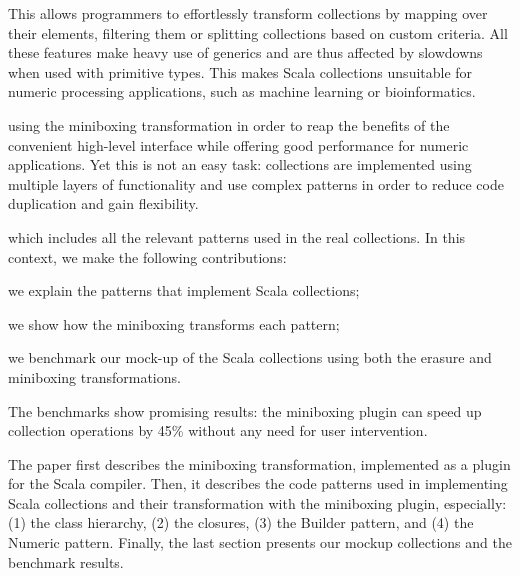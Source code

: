  This allows programmers to effortlessly transform collections by mapping over their elements, filtering them or splitting collections based on custom criteria. All these features make heavy use of generics and are thus affected by slowdowns when used with primitive types. This makes Scala collections unsuitable for numeric processing applications, such as machine learning or bioinformatics.

 using the miniboxing transformation in order to reap the benefits of the convenient high-level interface while offering good performance for numeric applications. Yet this is not an easy task: collections are implemented using multiple layers of functionality and use complex patterns in order to reduce code duplication and gain flexibility.

 which includes all the relevant patterns used in the real collections. In this context, we make the following contributions:

\begin{packed_item}
\item we explain the patterns that implement Scala collections;
\item we show how the miniboxing transforms each pattern;
\item we benchmark our mock-up of the Scala collections using both the erasure and miniboxing transformations.
\end{packed_item}

The benchmarks show promising results: the miniboxing plugin \cite{miniboxing-www} can speed up collection operations by 45\% without any need for user intervention.

The paper first describes the miniboxing transformation, implemented as a plugin for the Scala compiler. Then, it describes the code patterns used in implementing Scala collections and their transformation with the miniboxing plugin, especially: (1) the class hierarchy, (2) the closures, (3) the Builder pattern, and (4) the Numeric pattern. Finally, the last section presents our mockup collections and the benchmark results.